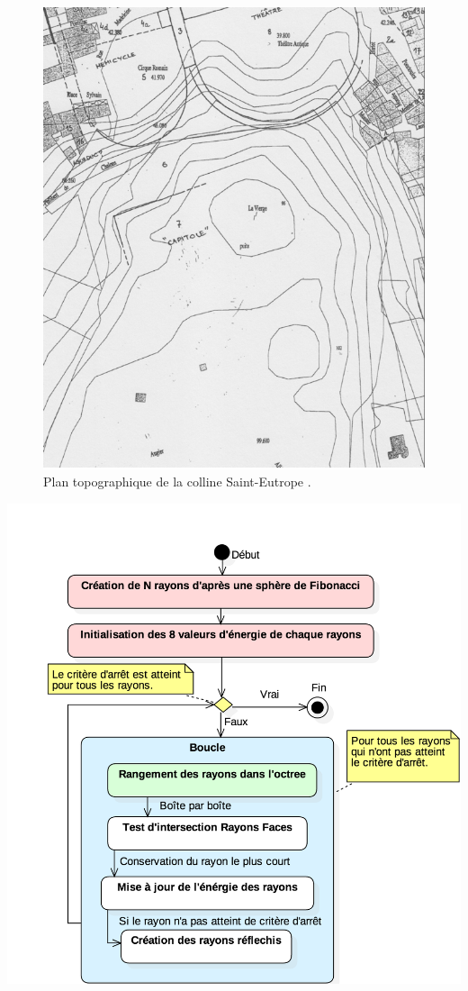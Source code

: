 \begin{figure}[!h]
	\includegraphics[width=\linewidth]{images/colline}
	\caption[Plan topographique de la colline Saint-Eutrope.]{Plan topographique de la colline Saint-Eutrope \cite[p.11]{orangeTxt}.}
	\label{colline} 
\end{figure} 	

\begin{figureth}
	\includegraphics[width=0.7\linewidth]{images/DiagRay2}
	\caption{Diagramme d'activité résumant le processus de création des rayons avec \gls{octree}.}
	\label{DiagRay2}
\end{figureth}	



